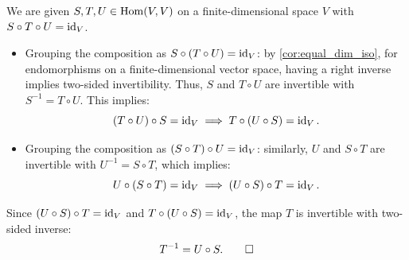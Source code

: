 \begin{exercisesolution}
\label{sol:invertibility_three_map_composition}
We are given $S, T, U \in \operatorname{Hom}(V, V)$ on a finite-dimensional space $V$ with $S \circ T \circ U = \operatorname{id}_V$.

\begin{itemize}
    \item Grouping the composition as $S \circ (T \circ U) = \operatorname{id}_V$: by \cref{cor:equal_dim_iso}, for endomorphisms on a finite-dimensional vector space, having a right inverse implies two-sided invertibility. Thus, $S$ and $T \circ U$ are invertible with $S^{-1} = T \circ U$. This implies:
    \[
    (T \circ U) \circ S = \operatorname{id}_V \implies T \circ (U \circ S) = \operatorname{id}_V.
    \]
    \item Grouping the composition as $(S \circ T) \circ U = \operatorname{id}_V$: similarly, $U$ and $S \circ T$ are invertible with $U^{-1} = S \circ T$, which implies:
    \[
    U \circ (S \circ T) = \operatorname{id}_V \implies (U \circ S) \circ T = \operatorname{id}_V.
    \]
\end{itemize}
Since $(U \circ S) \circ T = \operatorname{id}_V$ and $T \circ (U \circ S) = \operatorname{id}_V$, the map $T$ is invertible with two-sided inverse:
\[
T^{-1} = U \circ S. \qedhere
\]
\end{exercisesolution}


